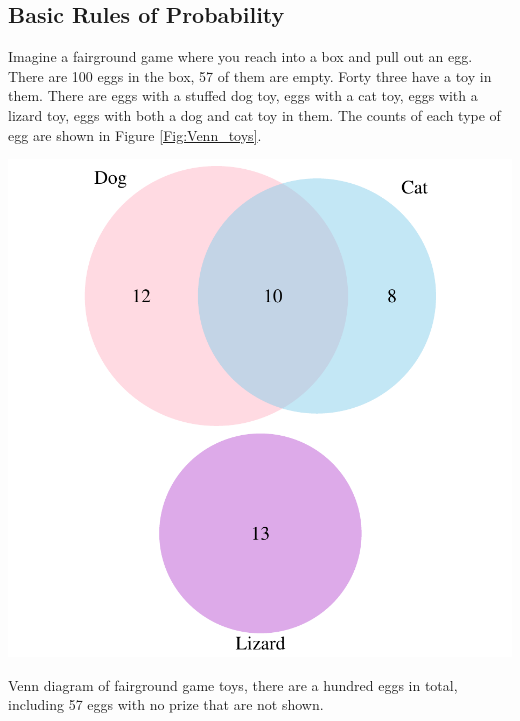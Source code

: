 \subsection{Basic Rules of Probability} \label{Section_rules_prob}
Imagine a fairground game where you reach into a box and pull out an
egg. There are 100 eggs in the box, 57 of them are empty. Forty three have a toy in them.
There are eggs with a stuffed dog toy, eggs with a cat toy, eggs with
a lizard toy, eggs with both a dog and cat toy in them. The counts of
each type of egg are shown in Figure \ref{Fig:Venn_toys}.


 \begin{marginfigure}
 \begin{center}
   \includegraphics[width=\textwidth]{math_background/dist_pics/Venn_toys.pdf}\end{center}
 \caption{Venn diagram of fairground game toys, there are a hundred
   eggs in total, including 57 eggs with no prize that are not shown. }\label{Fig:Venn_toys}
 \end{marginfigure}

